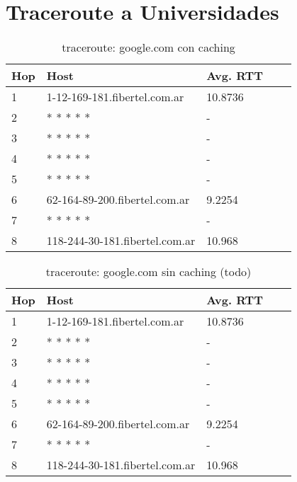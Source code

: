 \section{Traceroute a Universidades}

\begin{table}[H]
\centering
\begin{tabular}{@{}lllll@{}}
\toprule
Hop & Host & Avg. RTT \\ \midrule
1 & 1-12-169-181.fibertel.com.ar & 10.8736 \\
2 &  * * * * * & - \\
3 &  * * * * * & - \\
4 &  * * * * * & - \\
5 &  * * * * * & - \\
6 & 62-164-89-200.fibertel.com.ar & 9.2254 \\
7 &  * * * * * & - \\
8 & 118-244-30-181.fibertel.com.ar & 10.968 \\ \bottomrule
\end{tabular}
\caption{traceroute: google.com con caching}
\label{google}
\end{table}

\begin{table}[H]
\centering
\begin{tabular}{@{}lllll@{}}
\toprule
Hop & Host & Avg. RTT \\ \midrule
1 & 1-12-169-181.fibertel.com.ar & 10.8736 \\
2 &  * * * * * & - \\
3 &  * * * * * & - \\
4 &  * * * * * & - \\
5 &  * * * * * & - \\
6 & 62-164-89-200.fibertel.com.ar & 9.2254 \\
7 &  * * * * * & - \\
8 & 118-244-30-181.fibertel.com.ar & 10.968 \\ \bottomrule
\end{tabular}
\caption{traceroute: google.com sin caching (todo)}
\label{google}
\end{table}

